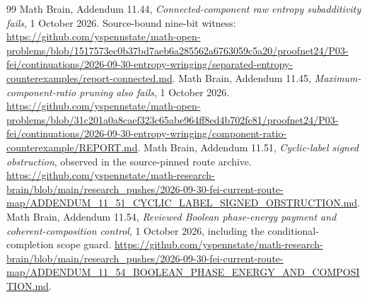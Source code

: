\documentclass[11pt]{article}
\begin{document}
\begin{thebibliography}{99}
 Math Brain, Addendum 11.44, \emph{Connected-component raw entropy subadditivity fails}, 1 October 2026. Source-bound nine-bit witness: \url{https://github.com/yspennstate/math-open-problems/blob/1517573ec0b37bd7aeb6a285562a6763059c5a20/proofnet24/P03-fei/continuations/2026-09-30-entropy-wringing/separated-entropy-counterexamples/report-connected.md}.
 Math Brain, Addendum 11.45, \emph{Maximum-component-ratio pruning also fails}, 1 October 2026. \url{https://github.com/yspennstate/math-open-problems/blob/31c201a0a8caef323c65abe964ff8ed4b702fc81/proofnet24/P03-fei/continuations/2026-09-30-entropy-wringing/component-ratio-counterexample/REPORT.md}.
 Math Brain, Addendum 11.51, \emph{Cyclic-label signed obstruction}, observed in the source-pinned route archive. \url{https://github.com/yspennstate/math-research-brain/blob/main/research_pushes/2026-09-30-fei-current-route-map/ADDENDUM_11_51_CYCLIC_LABEL_SIGNED_OBSTRUCTION.md}.
 Math Brain, Addendum 11.54, \emph{Reviewed Boolean phase-energy payment and coherent-composition control}, 1 October 2026, including the conditional-completion scope guard. \url{https://github.com/yspennstate/math-research-brain/blob/main/research_pushes/2026-09-30-fei-current-route-map/ADDENDUM_11_54_BOOLEAN_PHASE_ENERGY_AND_COMPOSITION.md}.


\end{thebibliography}
\end{document}
